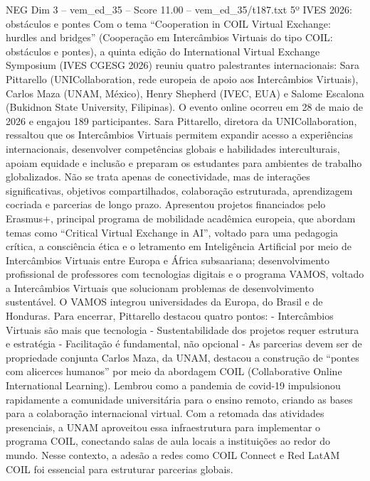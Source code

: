\begin{textsample}{NEG Dim 3 – vem\_ed\_35 – Score 11.00 – vem\_ed\_35/t187.txt}  \label{ex:f3_neg_138}
5º IVES 2026: obstáculos e pontes Com o tema “Cooperation in COIL Virtual Exchange: hurdles and bridges” (Cooperação em Intercâmbios Virtuais do tipo COIL: obstáculos e pontes), a quinta edição do International Virtual Exchange Symposium (IVES CGESG 2026) reuniu quatro palestrantes internacionais: Sara Pittarello (UNICollaboration, rede europeia de apoio aos Intercâmbios Virtuais), Carlos Maza (UNAM, México), Henry Shepherd (IVEC, EUA) e Salome Escalona (Bukidnon State University, Filipinas).
O evento online ocorreu em 28 de maio de 2026 e engajou 189 participantes.
Sara Pittarello, diretora da UNICollaboration, ressaltou que os Intercâmbios Virtuais permitem expandir acesso a experiências internacionais, desenvolver competências globais e habilidades interculturais, apoiam equidade e inclusão e preparam os estudantes para ambientes de trabalho globalizados.
Não se trata apenas de conectividade, mas de interações significativas, objetivos compartilhados, colaboração estruturada, aprendizagem cocriada e parcerias de longo prazo.
Apresentou projetos financiados pelo Erasmus+, principal programa de mobilidade acadêmica europeia, que abordam temas como “Critical Virtual Exchange in AI”, voltado para uma pedagogia crítica, a consciência ética e o letramento em Inteligência Artificial por meio de Intercâmbios Virtuais entre Europa e África subsaariana; desenvolvimento profissional de professores com tecnologias digitais e o programa VAMOS, voltado a Intercâmbios Virtuais que solucionam problemas de desenvolvimento sustentável.
O VAMOS integrou universidades da Europa, do Brasil e de Honduras.
Para encerrar, Pittarello destacou quatro pontos: - Intercâmbios Virtuais são mais que tecnologia - Sustentabilidade dos projetos requer estrutura e estratégia - Facilitação é fundamental, não opcional - As parcerias devem ser de propriedade conjunta Carlos Maza, da UNAM, destacou a construção de “pontes com alicerces humanos” por meio da abordagem COIL (Collaborative Online International Learning).
Lembrou como a pandemia de covid-19 impulsionou rapidamente a comunidade universitária para o ensino remoto, criando as bases para a colaboração internacional virtual.
Com a retomada das atividades presenciais, a UNAM aproveitou essa infraestrutura para implementar o programa COIL, conectando salas de aula locais a instituições ao redor do mundo.
Nesse contexto, a adesão a redes como COIL Connect e Red LatAM COIL foi essencial para estruturar parcerias globais.

\end{textsample}
